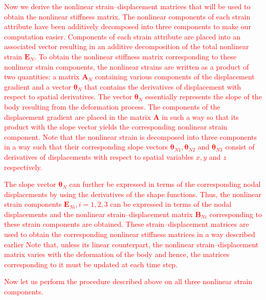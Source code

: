 \textcolor{red}{Now we derive the nonlinear strain--displacement matrices that will be used to obtain the nonlinear stiffness matrix. The nonlinear components of each strain attribute have been additively decomposed into three components to make our computation easier. Components of each strain attribute are placed into an associated vector resulting in an additive decomposition of the total nonlinear strain $\mathbf{E}_N$. To obtain the nonlinear stiffness matrix corresponding to these nonlinear strain components, the nonlinear strains are written as a product of two quantities: a matrix $\mathbf{A}_N$ containing various components of the displacement gradient and a vector $\boldsymbol{\theta}_N$ that contains the derivatives of displacement with respect to spatial derivatives. The vector $\boldsymbol{\theta}_N$ essentially represents the slope of the body resulting from the deformation process. The components of the displacement gradient are placed in the matrix $\mathbf{A}$ in such a way so that its product with the slope vector yields the corresponding nonlinear strain component. Note that the nonlinear strain is decomposed into three components in a way such that their corresponding slope vectors $\boldsymbol{\theta}_{N1}, \boldsymbol{\theta}_{N2}$ and $\boldsymbol{\theta}_{N3}$ consist of derivatives of displacements with respect to spatial variables $x, y$ and $z$ respectively.}

\textcolor{red}{The slope vector $\boldsymbol{\theta}_N$ can further be expressed in terms of the corresponding nodal displacements by using the derivatives of the shape functions. Thus, the nonlinear strain components $\mathbf{E}_{Ni}, i=1, 2, 3$ can be expressed in terms of the nodal displacements and the nonlinear strain--displacement matrix $\mathbf{B}_{Ni}$ corresponding to these strain components are obtained. These strain--displacement matrices are used to obtain the corresponding nonlinear stiffness matrices in a way described earlier Note that, unless its linear counterpart, the nonlinear strain--displacement matrix varies with the deformation of the body and hence, the matrices corresponding to it must be updated at each time step.}

\textcolor{red}{Now let us perform the procedure described above on all three nonlinear strain components.}

